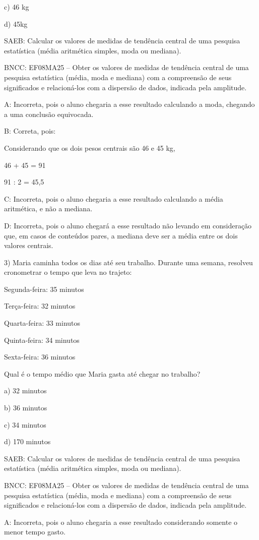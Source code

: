 c) 46 kg

d) 45kg

SAEB: Calcular os valores de medidas de tendência central de uma
pesquisa estatística (média aritmética simples, moda ou mediana).

BNCC: EF08MA25 -- Obter os valores de medidas de tendência central de
uma pesquisa estatística (média, moda e mediana) com a compreensão de
seus significados e relacioná-los com a dispersão de dados, indicada
pela amplitude.

A: Incorreta, pois o aluno chegaria a esse resultado calculando a moda,
chegando a uma conclusão equivocada.

B: Correta, pois:

Considerando que os dois pesos centrais são 46 e 45 kg,

46 + 45 = 91

91 : 2 = 45,5

C: Incorreta, pois o aluno chegaria a esse resultado calculando a média
aritmética, e não a mediana.

D: Incorreta, pois o aluno chegará a esse resultado não levando em
consideração que, em casos de conteúdos pares, a mediana deve ser a
média entre os dois valores centrais.

3) Maria caminha todos os dias até seu trabalho. Durante uma semana,
resolveu cronometrar o tempo que leva no trajeto:

Segunda-feira: 35 minutos

Terça-feira: 32 minutos

Quarta-feira: 33 minutos

Quinta-feira: 34 minutos

Sexta-feira: 36 minutos

Qual é o tempo médio que Maria gasta até chegar no trabalho?

a) 32 minutos

b) 36 minutos

c) 34 minutos

d) 170 minutos

SAEB: Calcular os valores de medidas de tendência central de uma
pesquisa estatística (média aritmética simples, moda ou mediana).

BNCC: EF08MA25 -- Obter os valores de medidas de tendência central de
uma pesquisa estatística (média, moda e mediana) com a compreensão de
seus significados e relacioná-los com a dispersão de dados, indicada
pela amplitude.

A: Incorreta, pois o aluno chegaria a esse resultado considerando
somente o menor tempo gasto.

